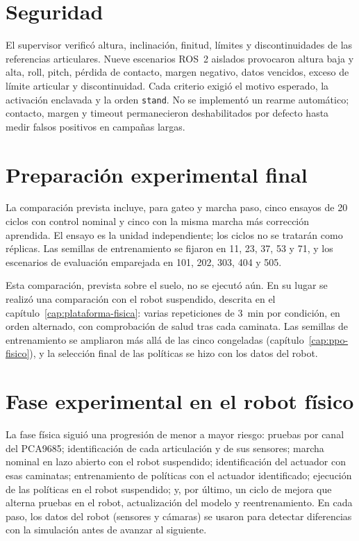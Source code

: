 \section{Seguridad}

El supervisor verificó altura, inclinación, finitud, límites y discontinuidades
de las referencias articulares. Nueve escenarios ROS~2 aislados provocaron
altura baja y alta, roll, pitch, pérdida de contacto, margen negativo, datos
vencidos, exceso de límite articular y discontinuidad. Cada criterio exigió el
motivo esperado, la activación enclavada y la orden \texttt{stand}. No se
implementó un rearme automático; contacto, margen y timeout permanecieron
deshabilitados por defecto hasta medir falsos positivos en campañas largas.

\section{Preparación experimental final}

La comparación prevista incluye, para gateo y marcha paso, cinco ensayos de 20
ciclos con control nominal y cinco con la misma marcha más corrección aprendida.
El ensayo es la unidad independiente; los ciclos no se tratarán como réplicas.
Las semillas de entrenamiento se fijaron en 11, 23, 37, 53 y 71, y los
escenarios de evaluación emparejada en 101, 202, 303, 404 y 505.

Esta comparación, prevista sobre el suelo, no se ejecutó aún. En su lugar se
realizó una comparación con el robot suspendido, descrita en el
capítulo~\ref{cap:plataforma-fisica}: varias repeticiones de 3~min por
condición, en orden alternado, con comprobación de salud tras cada caminata. Las
semillas de entrenamiento se ampliaron más allá de las cinco congeladas
(capítulo~\ref{cap:ppo-fisico}), y la selección final de las políticas se
hizo con los datos del robot.

\section{Fase experimental en el robot físico}

La fase física siguió una progresión de menor a mayor riesgo: pruebas por canal
del PCA9685; identificación de cada articulación y de sus sensores; marcha
nominal en lazo abierto con el robot suspendido; identificación del actuador con
esas caminatas; entrenamiento de políticas con el actuador identificado;
ejecución de las políticas en el robot suspendido; y, por último, un ciclo de
mejora que alterna pruebas en el robot, actualización del modelo y
reentrenamiento. En cada paso, los datos del robot (sensores y cámaras) se usaron
para detectar diferencias con la simulación antes de avanzar al siguiente.
